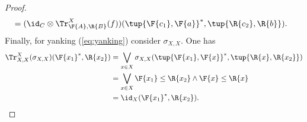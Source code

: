 \begin{proof}
\begin{equation}
\begin{aligned}
        &=(\id_C \otimes \Tr_{\F{A},\R{B}}^X(f))(\tup{\F{c_1},\F{a}}^*,\tup{\R{c_2},\R{b}}).
    \end{aligned}
\end{equation}
Finally, for yanking (\cref{eq:yanking}) consider $\sigma_{X,X}$. One has
\begin{equation}
    \begin{aligned}
        \Tr_{X,X}^{X}(\sigma_{X,X})(\F{x_1}^*,\R{x_2})&=\bigvee_{x\in X} \sigma_{X,X}(\tup{\F{x_1},\F{x}}^*,\tup{\R{x},\R{x_2}}) \\
        &=\bigvee_{x\in X} \F{x_1} \leq \R{x_2} \wedge \F{x}\leq \R{x}\\
        &=\id_X(\F{x_1}^*,\R{x_2}).
    \end{aligned}
\end{equation}
\end{proof}